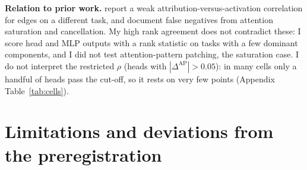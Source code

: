 \documentclass[10pt,a4paper]{article}
\newcommand{\AP}{\mathrm{AP}}
\begin{document}
\textbf{Relation to prior work.} \citet{syed2023attribution} report a weak attribution-versus-activation correlation for edges on a different task, and \citet{kramar2024atp} document false negatives from attention saturation and cancellation. My high rank agreement does not contradict these: I score head and MLP outputs with a rank statistic on tasks with a few dominant components, and I did not test attention-pattern patching, the saturation case. I do not interpret the restricted $\rho$ (heads with $|\Delta^{\AP}|>0.05$): in many cells only a handful of heads pass the cut-off, so it rests on very few points (Appendix Table~\ref{tab:cells}).

\section{Limitations and deviations from the preregistration}\label{sec:dev}
\end{document}
